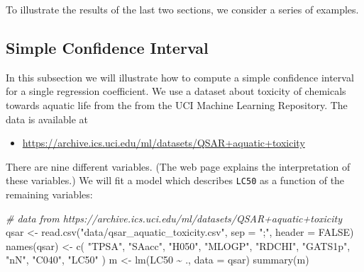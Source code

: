 \documentclass[
  a4paper,
]{article}
\newenvironment{Shaded}{\begin{snugshade}}{\end{snugshade}}
\newcommand{\AttributeTok}[1]{\textcolor[rgb]{0.77,0.63,0.00}{#1}}
\newcommand{\CommentTok}[1]{\textcolor[rgb]{0.56,0.35,0.01}{\textit{#1}}}
\newcommand{\ConstantTok}[1]{\textcolor[rgb]{0.00,0.00,0.00}{#1}}
\newcommand{\FunctionTok}[1]{\textcolor[rgb]{0.00,0.00,0.00}{#1}}
\newcommand{\NormalTok}[1]{#1}
\newcommand{\OtherTok}[1]{\textcolor[rgb]{0.56,0.35,0.01}{#1}}
\newcommand{\SpecialCharTok}[1]{\textcolor[rgb]{0.00,0.00,0.00}{#1}}
\newcommand{\StringTok}[1]{\textcolor[rgb]{0.31,0.60,0.02}{#1}}
\providecommand{\tightlist}{%
  \setlength{\itemsep}{0pt}\setlength{\parskip}{0pt}}
\theoremstyle{definition}
\theoremstyle{definition}
\theoremstyle{definition}
\theoremstyle{definition}
\theoremstyle{remark}
\begin{document}
To illustrate the results of the last two sections, we consider a series
of examples.

\hypertarget{simple-confidence-interval}{%
\subsection{Simple Confidence Interval}\label{simple-confidence-interval}}

In this subsection we will illustrate how to compute a simple confidence interval
for a single regression coefficient. We use a dataset about toxicity of
chemicals towards aquatic life from the from the UCI Machine Learning
Repository. The data is available at

\begin{itemize}
\tightlist
\item
  \url{https://archive.ics.uci.edu/ml/datasets/QSAR+aquatic+toxicity}
\end{itemize}

There are nine different variables. (The web page explains the interpretation
of these variables.) We will fit a model which describes \texttt{LC50} as a function
of the remaining variables:

\begin{Shaded}
\begin{Highlighting}[]
\CommentTok{\# data from https://archive.ics.uci.edu/ml/datasets/QSAR+aquatic+toxicity}
\NormalTok{qsar }\OtherTok{\textless{}{-}} \FunctionTok{read.csv}\NormalTok{(}\StringTok{"data/qsar\_aquatic\_toxicity.csv"}\NormalTok{, }\AttributeTok{sep =} \StringTok{";"}\NormalTok{, }\AttributeTok{header =} \ConstantTok{FALSE}\NormalTok{)}
\FunctionTok{names}\NormalTok{(qsar) }\OtherTok{\textless{}{-}} \FunctionTok{c}\NormalTok{(}
    \StringTok{"TPSA"}\NormalTok{,}
    \StringTok{"SAacc"}\NormalTok{,}
    \StringTok{"H050"}\NormalTok{,}
    \StringTok{"MLOGP"}\NormalTok{,}
    \StringTok{"RDCHI"}\NormalTok{,}
    \StringTok{"GATS1p"}\NormalTok{,}
    \StringTok{"nN"}\NormalTok{,}
    \StringTok{"C040"}\NormalTok{,}
    \StringTok{"LC50"}
\NormalTok{)}
\NormalTok{m }\OtherTok{\textless{}{-}} \FunctionTok{lm}\NormalTok{(LC50 }\SpecialCharTok{\textasciitilde{}}\NormalTok{ ., }\AttributeTok{data =}\NormalTok{ qsar)}
\FunctionTok{summary}\NormalTok{(m)}
\end{Highlighting}
\end{Shaded}
\end{document}
